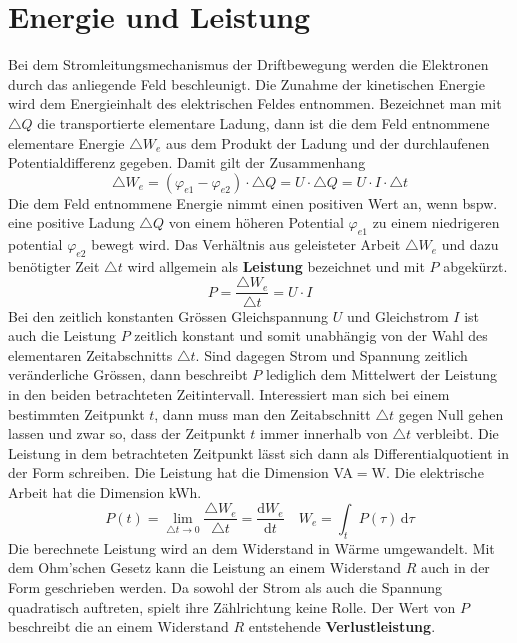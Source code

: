 \section{Energie und Leistung}
Bei dem Stromleitungsmechanismus der Driftbewegung werden die Elektronen durch das anliegende Feld beschleunigt. Die Zunahme der kinetischen Energie wird dem Energieinhalt des elektrischen Feldes entnommen. Bezeichnet man mit $\triangle Q$ die transportierte elementare Ladung, dann ist die dem Feld entnommene elementare Energie $\triangle W_e$ aus dem Produkt der Ladung und der durchlaufenen Potentialdifferenz gegeben. Damit gilt der Zusammenhang
\begin{equation}
\boxed{\triangle W_e=\left(\varphi_{e1}-\varphi_{e2}\right)\cdot \triangle Q=U\cdot \triangle Q=U\cdot I\cdot \triangle t}
\end{equation}
Die dem Feld entnommene Energie nimmt einen positiven Wert an, wenn bspw. eine positive Ladung $\triangle Q$ von einem höheren Potential $\varphi_{e1}$ zu einem niedrigeren potential $\varphi_{e2}$ bewegt wird. Das Verhältnis aus geleisteter Arbeit $\triangle W_e$ und dazu benötigter Zeit $\triangle t$ wird allgemein als \textbf{Leistung} bezeichnet und mit $P$ abgekürzt.
\begin{equation}
\boxed{P=\dfrac{\triangle W_e}{\triangle t}=U\cdot I}
\end{equation}
Bei den zeitlich konstanten Grössen Gleichspannung $U$ und Gleichstrom $I$ ist auch die Leistung $P$ zeitlich konstant und somit unabhängig von der Wahl des elementaren Zeitabschnitts $\triangle t$. Sind dagegen Strom und Spannung zeitlich veränderliche Grössen, dann beschreibt $P$ lediglich dem Mittelwert der Leistung in den beiden betrachteten Zeitintervall. Interessiert man sich bei einem bestimmten Zeitpunkt $t$, dann muss man den Zeitabschnitt $\triangle t$ gegen Null gehen lassen und zwar so, dass der Zeitpunkt $t$ immer innerhalb von $\triangle t$ verbleibt. Die Leistung in dem betrachteten Zeitpunkt lässt sich dann als Differentialquotient in der Form schreiben. Die Leistung hat die Dimension VA$=$W. Die elektrische Arbeit hat die Dimension kWh.
\begin{equation}
\boxed{P\left(t\right)=\displaystyle \lim_{\triangle t\rightarrow 0}\dfrac{\triangle W_e}{\triangle t}=\dfrac{\text{d}W_e}{\text{d}t}}\quad \boxed{W_e=\displaystyle \int_tP\left(\tau\right)\,\text{d}\tau}
\end{equation}
Die berechnete Leistung wird an dem Widerstand in Wärme umgewandelt. Mit dem Ohm'schen Gesetz kann die Leistung an einem Widerstand $R$ auch in der Form geschrieben werden. Da sowohl der Strom als auch die Spannung quadratisch auftreten, spielt ihre Zählrichtung keine Rolle. Der Wert von $P$ beschreibt die an einem Widerstand $R$ entstehende \textbf{Verlustleistung}.  
